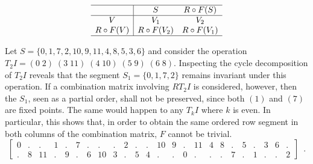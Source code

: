 \begin{equation}
\begin{array}{c|cc}
	\hline
    & S & R \circ F(S) \\
    \hline
    V & V_1 & V_2 \\
    R \circ F(V) & R \circ F(V_2) & R \circ F(V_1) \\
    \hline
\end{array}
\label{eq:derivation-retrograde}
\end{equation}

\begin{example}
    \cite[212]{Starr1984}
    \label{ex:derivation-unordered}
    Let $S = \{ 0, 1, 7, 2, 10, 9, 11, 4, 8, 5, 3, 6 \}$ and consider the operation $T_2I = (0 \; 2) \; (3 \; 11) \; (4 \; 10) \; (5 \; 9) \; (6 \; 8)$. Inspecting the cycle decomposition of $T_2I$ reveals that the segment $S_1 = \{ 0, 1, 7, 2 \}$ remains invariant under this operation. If a combination matrix involving $RT_2I$ is considered, however, then the $S_1$, seen as a partial order, shall not be preserved, since both $(1)$ and $(7)$ are fixed points. The same would happen to any $T_kI$ where $k$ is even. In particular, this shows that, in order to obtain the same ordered row segment in both columns of the combination matrix, $F$ cannot be trivial.
	\begin{equation}
    	\left[
    	\begin{array}{cccccccccccc|cccccccccccc}
        	0 & . & . & 1 & . & 7 & . & . & . & 2 & . & . & 10 & 9 & . & 11 & 4 & 8 & . & 5 & . & 3 & 6 & . \\
        	. & 8 & 11 & . & 9 & . & 6 & 10 & 3 & . & 5 & 4 & . & . & 0 & . & . & . & 7 & . & 1 & . & . & 2
    	\end{array}
    	\right] \enspace.
	\end{equation}
\end{example}

